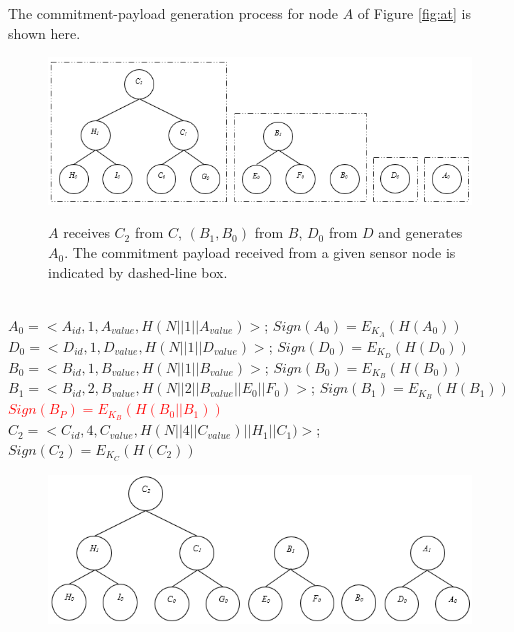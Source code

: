 			\begin{exmp} The commitment-payload generation process for node $A$ of Figure \ref{fig:at} is shown here.\\
				\begin{figure}[hp]
					\centering
					\includegraphics[scale = 1]{images/commitment-tree-example-1.png}\\
					\caption{$A$ receives $C_{2}$ from $C$, $(B_{1},B_{0})$ from $B$, $D_{0}$ from $D$ and generates $A_{0}$. The commitment payload received from a given sensor node is indicated by dashed-line box.}
					\label{fig:commitment-tree-example-1}
				\end{figure}\\
				$A_{0} = <A_{id}, 1, A_{value}, H(N||1||A_{value})>$; $Sign(A_{0}) = E_{K_{A}}(H(A_{0}))$ \\
				$D_{0} = <D_{id}, 1, D_{value}, H(N||1||D_{value})>$; $Sign(D_{0}) = E_{K_{D}}(H(D_{0}))$\\
				$B_{0} = <B_{id}, 1, B_{value}, H(N||1||B_{value})>$; $Sign(B_{0}) = E_{K_{B}}(H(B_{0}))$\\
				$B_{1} = <B_{id}, 2, B_{value}, H(N||2||B_{value}||E_{0}||F_{0})>$; $Sign(B_{1}) = E_{K_{B}}(H(B_{1}))$\\
				\textcolor{red}{$Sign(B_{P}) = E_{K_{B}}(H(B_{0} || B_{1}))$}\\
				$C_{2} = <C_{id}, 4, C_{value}, H(N||4||C_{value})||H_{1}||C_{1})>$; $Sign(C_{2}) = E_{K_{C}}(H(C_{2}))$\\
				\begin{figure}[hp]
					\centering
					\includegraphics[scale = 1]{images/commitment-tree-example-2.png}\\

\end{figure}
\end{exmp}
